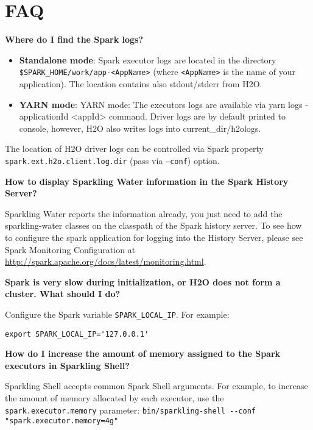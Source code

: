 \section{FAQ}



\textbf{Where do I find the Spark logs?}

\begin{itemize}
    \item \textbf{Standalone mode}: Spark executor logs are located in the directory {\lstinline[style=Bash]|$SPARK_HOME/work/app-<AppName>|} (where \texttt{<AppName>} is the name of your application). The location contains also stdout/stderr from H2O.
    \item \textbf{YARN mode}: YARN mode: The executors logs are available via yarn logs -applicationId <appId> command. Driver logs are by default printed to console, however, H2O also writes logs into current\_dir/h2ologs.
\end{itemize}

The location of H2O driver logs can be controlled via Spark property \\ \texttt{spark.ext.h2o.client.log.dir} (pass via \texttt{--conf}) option.

\textbf{How to display Sparkling Water information in the Spark History Server?}

Sparkling Water reports the information already, you just need to add the sparkling-water classes on the classpath of the Spark history server. To see how to configure the spark application for logging into the History Server, please see Spark Monitoring Configuration at
\url{http://spark.apache.org/docs/latest/monitoring.html}.

\textbf{Spark is very slow during initialization, or H2O does not form a cluster. What should I do?}

Configure the Spark variable \texttt{SPARK\_LOCAL\_IP}. For example:
       
\begin{lstlisting}[style=Bash]
export SPARK_LOCAL_IP='127.0.0.1'
\end{lstlisting}

\textbf{How do I increase the amount of memory assigned to the Spark executors in Sparkling Shell?}

Sparkling Shell accepts common Spark Shell arguments. For example, to increase the amount of memory allocated by each executor, use the \\ \texttt{spark.executor.memory} parameter: {\lstinline[style=Bash]|bin/sparkling-shell --conf "spark.executor.memory=4g"|}

